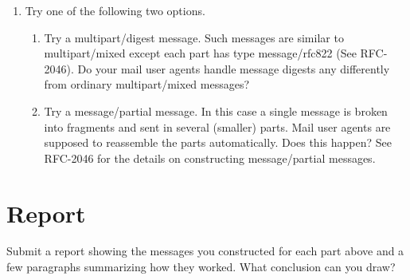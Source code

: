 \documentclass[twocolumn]{article}
\begin{document}
\begin{enumerate}
\item Try one of the following two options.
  \begin{enumerate}
  \item Try a multipart/digest message. Such messages are similar to multipart/mixed except each
    part has type message/rfc822 (See RFC-2046). Do your mail user agents handle message digests
    any differently from ordinary multipart/mixed messages?

  \item Try a message/partial message. In this case a single message is broken into fragments
    and sent in several (smaller) parts. Mail user agents are supposed to reassemble the parts
    automatically. Does this happen? See RFC-2046 for the details on constructing
    message/partial messages.
  \end{enumerate}
\end{enumerate}

\section{Report}

Submit a report showing the messages you constructed for each part above and a few paragraphs
summarizing how they worked. What conclusion can you draw?
\end{document}
